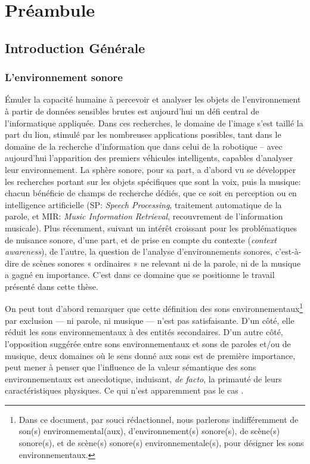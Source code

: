 \chapter{Préambule}\label{ch:pream_intro}


\section{Introduction Générale}

\subsection{L'environnement sonore}

Émuler la capacité humaine à percevoir et analyser les objets de l'environnement à partir de données sensibles brutes est aujourd'hui un défi central de l'informatique appliquée. Dans ces recherches, le domaine de l'image s'est taillé la part du lion, stimulé par les nombreuses applications possibles, tant dans le domaine de la recherche d'information que dans celui de la robotique -- avec aujourd'hui l'apparition des premiers véhicules intelligents, capables d'analyser leur environnement. La sphère sonore, pour sa part, a d'abord vu se développer les recherches portant sur les objets spécifiques que sont la voix, puis la musique: chacun bénéficie de champs de recherche dédiés, que ce soit en perception ou en intelligence artificielle (SP: \emph{Speech Processing}, traitement automatique de la parole, et MIR: \emph{Music Information Retrieval}, recouvrement de l'information musicale). Plus récemment, suivant un intérêt croissant pour les problématiques de nuisance sonore, d'une part, et de prise en compte du contexte (\emph{context awareness}), de l'autre, la question de l'analyse d'environnements sonores, c'est-à-dire de scènes sonores « ordinaires » ne relevant ni de la parole, ni de la musique a gagné en importance. C'est dans ce domaine que se positionne le travail présenté dans cette thèse.

On peut tout d'abord remarquer que cette définition des sons environnementaux\footnote{Dans ce document, par souci rédactionnel, nous parlerons indifféremment de son(s) environnemental(aux), d'environnement(s) sonore(s), de scène(s) sonore(s), et de scène(s) sonore(s) environnementale(s), pour désigner les sons environnementaux.} par exclusion --- ni parole, ni musique --- n'est pas satisfaisante. D'un côté, elle réduit les sons environnementaux à des entités secondaires. D'un autre côté, l'opposition suggérée entre sons environnementaux et sons de paroles et/ou de musique, deux domaines où le sens donné aux sons est de première importance, peut mener à penser que l'influence de la valeur sémantique des sons environnementaux est anecdotique, induisant, \emph{de facto}, la primauté de leurs caractéristiques physiques. Ce qui n'est apparemment pas le cas \citep{ballas1987interpreting}.


